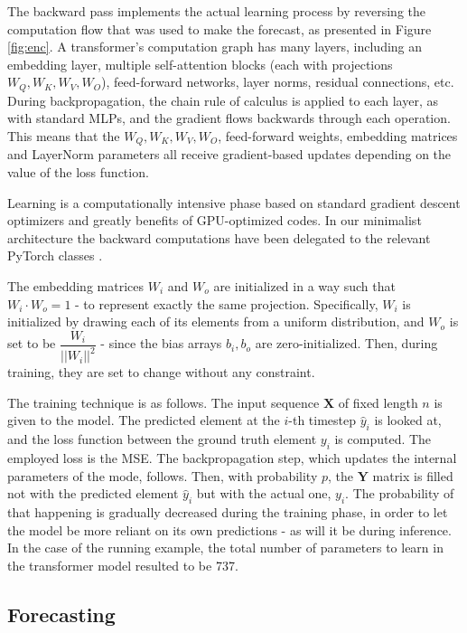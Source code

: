\documentclass[algorithms,article,submit,pdftex,moreauthors]{Definitions/mdpi}
\begin{document}
The backward pass implements the actual learning process by reversing the computation flow that was used to make the forecast, as presented in Figure \ref{fig:enc}. A transformer's computation graph has many layers, including an embedding layer, multiple self-attention blocks (each with projections $W_Q, W_K, W_V, W_O$), feed-forward networks, layer norms, residual connections, etc. During backpropagation, the chain rule of calculus is applied to each layer, as with standard MLPs, and the gradient flows backwards through each operation. This means that the $W_Q, W_K, W_V, W_O$, feed-forward weights, embedding matrices and LayerNorm parameters all receive gradient-based updates depending on the value of the loss function.

Learning is a computationally intensive phase based on standard gradient descent optimizers and greatly benefits of GPU-optimized codes. In our minimalist architecture the backward computations have been delegated to the relevant PyTorch classes  \cite{PyTorch25}.

The embedding matrices $W_i$ and $W_o$ are initialized in a way such that $W_i \cdot W_o = 1$ - to represent exactly the same projection. Specifically, $W_i$ is initialized by drawing each of its elements from a uniform distribution, and $W_o$ is set to be $\dfrac{W_i}{||W_i||^2}$ - since the bias arrays $b_i, b_o$ are zero-initialized. Then, during training, they are set to change without any constraint.

The training technique is as follows. The input sequence $\textbf{X}$ of fixed length $n$ is given to the model. The predicted element at the $i$-th timestep $\hat y_i$ is looked at, and the loss function between the ground truth element $y_i$ is computed. The employed loss is the MSE. The backpropagation step, which updates the internal parameters of the mode, follows. Then, with probability $p$, the $\textbf{Y}$ matrix is filled not with the predicted element $\hat y_i$ but with the actual one, $y_i$. The probability of that happening is gradually decreased during the training phase, in order to let the model be more reliant on its own predictions - as will it be during inference. In the case of the running example, the total number of parameters to learn in the transformer model resulted to be 737. 


\subsection{Forecasting} \label{subsec:forecasting}
\end{document}
